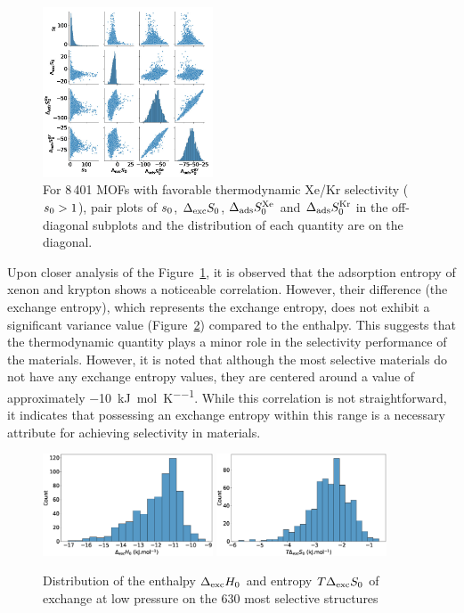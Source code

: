 \documentclass[main.tex]{subfiles}
\begin{document}
\begin{figure}[ht]
  \centering
    \includegraphics[width=0.45\textwidth]{figures/2-thermo/Entropy_0.jpg}
    \caption{For 8\,401 MOFs with favorable thermodynamic Xe/Kr selectivity ($s_{\text{0}} > 1$), pair plots of $s_{\text{0}}$, $\Delta_{\text{exc}}S_{\text{0}}$, $\Delta_{\text{ads}}S^{\text{Xe}}_{\text{0}}$ and $\Delta_{\text{ads}}S^{\text{Kr}}_{\text{0}}$ in the off-diagonal subplots and the distribution of each quantity are on the diagonal.}\label{fgr:SI:HS_0_log}
\end{figure}

Upon closer analysis of the Figure~\ref{fgr:SI:HS_0_log}, it is observed that the adsorption entropy of xenon and krypton shows a noticeable correlation. However, their difference (the exchange entropy), which represents the exchange entropy, does not exhibit a significant variance value (Figure~\ref{fgr:SI:dist0}) compared to the enthalpy. This suggests that the thermodynamic quantity plays a minor role in the selectivity performance of the materials. However, it is noted that although the most selective materials do not have any exchange entropy values, they are centered around a value of approximately \SI{-10}{\kilo\joule\per\mole\per\kelvin}. While this correlation is not straightforward, it indicates that possessing an exchange entropy within this range is a necessary attribute for achieving selectivity in materials.

\begin{figure}[ht]
  \centering
    \includegraphics[width=0.45\textwidth]{figures/2-thermo/Delta_H_0.jpg}
    \includegraphics[width=0.45\textwidth]{figures/2-thermo/T_Delta_S_0.jpg}
    \caption{Distribution of the enthalpy $\Delta_{\text{exc}}H_{\text{0}}$ and entropy $T\Delta_{\text{exc}}S_{\text{0}}$ of exchange at low pressure on the 630 most selective structures}\label{fgr:SI:dist0}
\end{figure}
\end{document}
